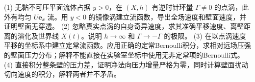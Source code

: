 (1) 无黏不可压平面流体占据 \(y>0\)，在 \((X,h)\) 有逆时针环量 \(\Gamma\ne0\) 的点涡，此外有均匀 \(U\mathbf e_x\) 流。用 \(y<0\) 的镜像涡建立流函数，导出全场速度和壁面速度，并证明壁面无穿透。
(2) 忽略真实点涡的自身奇异速度，求其准确平移速度、离壁距离的演化及世界线 \(X(t)\)。说明 \(h\to\infty\) 和 \(\Gamma\to-\Gamma\) 的极限。
(3) 在以点涡速度平移的坐标系中建立定常流函数。应用正确的定常Bernoulli积分，求相对远场压强的壁面压力分布；解释不能直接在实验室坐标中使用无非定常项的Bernoulli式。
(4) 直接积分整条壁的压力差，证明净法向压力增量严格为零，同时计算壁面扰动切向速度的积分，解释两者并不矛盾。
